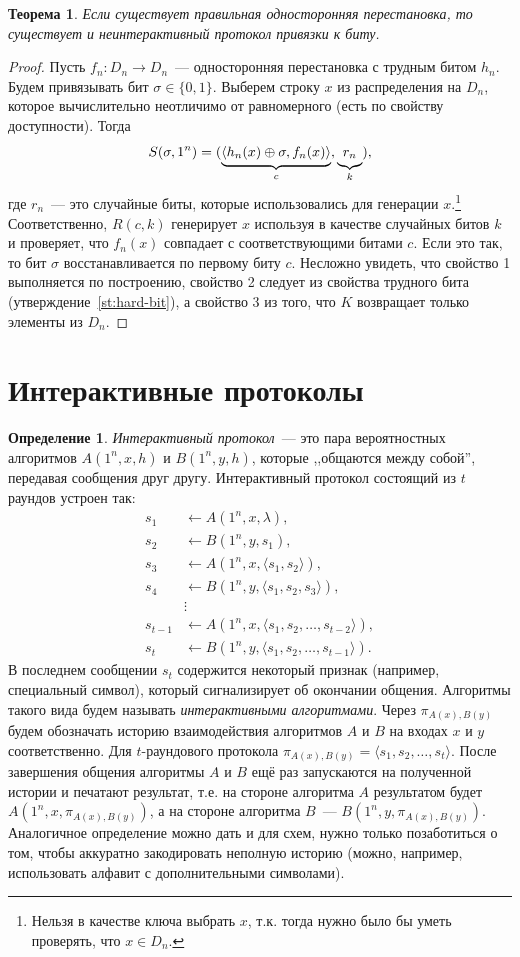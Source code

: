 \documentclass[12pt,a4paper]{article}
\newcommand{\bits}{\{0,1\}}
\theoremstyle{definition}
\newtheorem{definition}{Определение}[section]
\theoremstyle{plain}
\newtheorem{theorem}{Теорема}[section]
\theoremstyle{remark}
\begin{document}
\begin{theorem}
Если существует правильная односторонняя перестановка, то существует и 
неинтерактивный протокол привязки к биту.
\end{theorem}
\begin{proof}
Пусть $f_n : D_n\to D_n$~--- односторонняя перестановка с трудным битом $h_n$.
Будем привязывать бит $\sigma\in\bits$. Выберем строку $x$ из распределения 
на $D_n$, которое вычислительно неотличимо от равномерного (есть по свойству доступности).
Тогда $$S(\sigma, 1^n) = (\underbrace{\strut\langle h_n(x)\oplus \sigma, f_n(x)\rangle}_{c}, \underbrace{\strut r_n}_{k}),$$ где $r_n$~--- это случайные биты, которые использовались для генерации $x$.\footnote{Нельзя в качестве ключа выбрать $x$, т.к. тогда нужно было бы уметь проверять, что $x\in D_n$.} Соответственно, $R(c, k)$ генерирует $x$ используя в качестве случайных битов $k$ и проверяет, что $f_n(x)$ совпадает с соответствующими битами $c$. Если это так, то бит $\sigma$ восстанавливается по первому биту $c$. Несложно увидеть, что свойство 1 выполняется по построению, свойство 2 следует из свойства трудного бита (утверждение~\ref{st:hard-bit}), а свойство 3 из того, что $K$ возвращает только элементы из $D_n$.
\end{proof}

\section{Интерактивные протоколы}
\begin{definition}
\emph{Интерактивный протокол}~--- это пара вероятностных алгоритмов $A(1^n, x, h)$ и $B(1^n, y, h)$,
которые ,,общаются между собой'', передавая сообщения друг другу.
Интерактивный протокол состоящий из $t$ раундов устроен так:
\begin{align*}
s_1&\gets A(1^n, x, \lambda),\\
s_2&\gets B(1^n, y, s_1),\\
s_3&\gets A(1^n, x, \langle s_1, s_2\rangle),\\
s_4&\gets B(1^n, y, \langle s_1, s_2, s_3\rangle),\\
&\vdots\\
s_{t-1}&\gets A(1^n, x, \langle s_1, s_2,\dotsc,s_{t-2}\rangle),\\
s_{t}  &\gets B(1^n, y, \langle s_1, s_2,\dotsc,s_{t-1}\rangle).
\end{align*}
В последнем сообщении $s_t$ содержится некоторый признак (например, специальный символ),
который сигнализирует об окончании общения.
Алгоритмы такого вида будем называть \emph{интерактивными алгоритмами}.
Через $\pi_{A(x),B(y)}$ будем обозначать историю взаимодействия алгоритмов $A$ и $B$
на входах $x$ и $y$ соответственно. Для $t$-раундового протокола $\pi_{A(x),B(y)} = \langle s_1, s_2,\dotsc,s_{t}\rangle$. После завершения общения алгоритмы $A$ и $B$ ещё раз запускаются 
на полученной истории и печатают результат, т.е. на стороне алгоритма $A$ результатом будет
$A(1^n, x, \pi_{A(x),B(y)})$, а на стороне алгоритма $B$~--- $B(1^n, y, \pi_{A(x),B(y)})$. 
Аналогичное определение можно дать и для схем, нужно только позаботиться о том, чтобы аккуратно
закодировать неполную историю (можно, например, использовать алфавит с дополнительными символами).
\end{definition}
\end{document}
